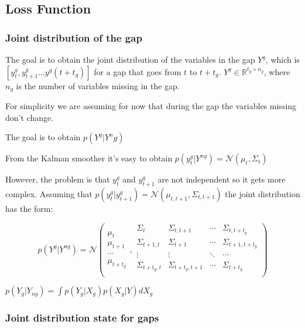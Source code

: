 \documentclass{article}
\begin{document}
\subsection{Loss Function}

\subsubsection{Joint distribution of the gap}

The goal is to obtain the joint distribution of the variables in the gap $Y^g$, which is $[y^g_t, y^g_{t+1} ... y^g(t+t_g)]$
for a gap that goes from $t$ to $t+t_g$. $Y^g \in \mathbb{R}^{t_g \times n_g}$, where $n_g$ is the number of variables missing in the gap.

For simplicity we are assuming for now that during the gap the variables missing don't change.

The goal is to obtain $p(Y^g|Y^ng)$

From the Kalman smoother it's easy to obtain $p(y^g_t|Y^{ng}) = \mathcal{N}(\mu_{t}, \Sigma_{t})$

However, the problem is that $y^g_t$ and $y^g_{t+1}$ are not independent so it gets more complex.
Assuming that $p(y^g_t|y^g_{t+1}) = \mathcal{N}(\mu_{t,t+1}, \Sigma_{t,t+1})$ the joint distribution has the form:

$$ p(Y^g|Y^{ng}) = \mathcal{N}\left(\begin{array}{c}
     \mu_{t}   \\
     \mu_{t+1} \\
     \cdots    \\
     \mu_{t+t_g}
\end{array},
\begin{array}{cccc}
    \Sigma_{t}       & \Sigma_{t,t+1}     & \cdots & \Sigma_{t,t+t_g}   \\
    \Sigma_{t+1,t}   & \Sigma_{t+1}       & \cdots & \Sigma_{t+1,t+t_g} \\
    \vdots           & \vdots             & \ddots & \cdots             \\ 
    \Sigma_{t+t_g,t} & \Sigma_{t+t_g,t+1} & \cdots & \Sigma_{t+t_g}     \\
\end{array}\right)$$


$p(Y_g|Y_{ng}) = \int p(Y_g|X_g)p(X_g|Y)dX_g$


\subsubsection{Joint distribution state for gaps}
\end{document}

